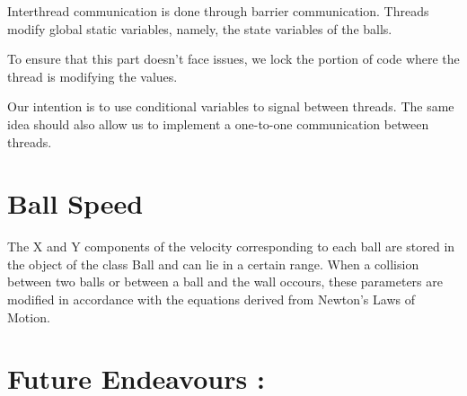 \documentclass[]{article}
\begin{document}
Interthread communication is done through barrier communication. Threads modify global static variables, namely, the state variables of the balls.

To ensure that this part doesn't face issues, we lock the portion of code where the thread is modifying the values.

Our intention is to use conditional variables to signal between threads. The same idea should also allow us to implement a one-to-one communication between threads.

\begin{flushleft}


\end{flushleft}

\section{Ball Speed}

\begin{flushleft}

The X and Y components of the velocity corresponding to each ball are stored in the  object of the class Ball and can lie in a certain range. When a collision between two balls or between a ball and the wall occours, these parameters are modified in accordance with the equations derived from Newton's Laws of Motion.  

\end{flushleft}


\section{Future Endeavours :}
\end{document}

